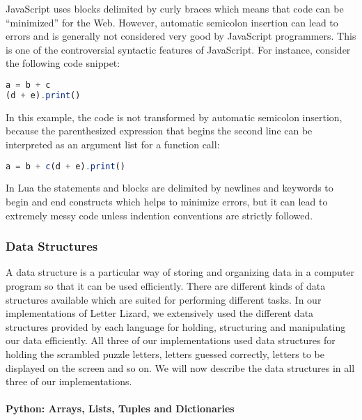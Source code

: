 JavaScript uses blocks delimited by curly braces which means that code can be ``minimized'' for the Web. However, automatic semicolon insertion can lead to errors and is generally not considered very good by JavaScript programmers. This is one of the controversial syntactic features of JavaScript. For instance, consider the following code snippet:

\noindent\begin{minipage}[t]{1\linewidth}
\begin{lstlisting}[language={JavaScript},caption=An example where automatic semicolon insertion in JavaScript may lead to unexpected results]
a = b + c
(d + e).print()
\end{lstlisting}
\end{minipage}

In this example, the code is not transformed by automatic semicolon insertion, because the parenthesized expression that begins the second line can be interpreted as an argument list for a function call:
\begin{lstlisting}[language={JavaScript},caption=The interpretation of the previous example]
	a = b + c(d + e).print()
\end{lstlisting}

In Lua the statements and blocks are delimited by newlines and keywords to begin and end constructs which helps to minimize errors, but it can lead to extremely messy code unless indention conventions are strictly followed.


\subsubsection{Data Structures}
\label{datastructs}

A data structure is a particular way of storing and organizing data in a computer program so that it can be used efficiently. There are different kinds of data structures available which are suited for performing different tasks. In our implementations of Letter Lizard, we extensively used the different data structures provided by each language for holding, structuring and manipulating our data efficiently. All three of our implementations used data structures for holding the scrambled puzzle letters, letters guessed correctly, letters to be displayed on the screen and so on. We will now describe the data structures in all three of our implementations.

\paragraph{Python: Arrays, Lists, Tuples and Dictionaries}


